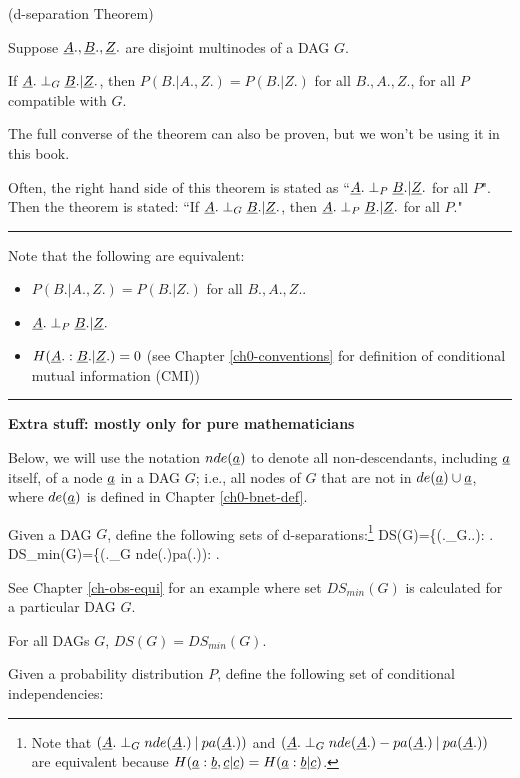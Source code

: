 \begin{claim}(d-separation Theorem)

Suppose
${\underline{A}}., {\underline{B}}., {\underline{Z}}.$
are disjoint multinodes
of a DAG  $G$.

If 
${\underline{A}}.\perp_G {\underline{B}}.|{\underline{Z}}.$, then
$P(B.|A., Z.)=P(B.|Z.)$
for all $B.,A., Z.$,
for all $P$
compatible with $G$.

\end{claim}
The full converse
of the theorem can also be 
proven, 
but we won't be using it
in this book.

Often, the right hand side
of this theorem is stated as 
``${\underline{A}}.\perp_P {\underline{B}}.|{\underline{Z}}.$
for all $P$".
Then the theorem is stated:
``If 
${\underline{A}}.\perp_G {\underline{B}}.|{\underline{Z}}.$, then
${\underline{A}}.\perp_P {\underline{B}}.|{\underline{Z}}.$ for all $P$."  

\hrule
Note that 
the following are equivalent:
\begin{itemize}
\item
$P(B.|A., Z.)=P(B.|Z.)$ for all $B., A., Z.$.
\item
${\underline{A}}.\perp_P {\underline{B}}.|{\underline{Z}}.$
\item
$H({\underline{A}}.:{\underline{B}}.|{\underline{Z}}.)=0$
(see Chapter \ref{ch0-conventions}
for definition of
 conditional mutual information (CMI))
\end{itemize}
\hrule\noindent
{\bf Extra stuff: mostly only for 
 pure mathematicians}

Below, we will use
the notation $nde({\underline{a}})$
to denote
all non-descendants,
including ${\underline{a}}$ itself, 
of a node ${\underline{a}}$
in a DAG $G$; i.e.,
all nodes of $G$ that are not
in $de({\underline{a}})\cup {\underline{a}}$, where
$de({\underline{a}})$
is defined in Chapter \ref{ch0-bnet-def}.

Given a DAG $G$, define 
the following
sets of d-separations:\footnote{
Note that
$({\underline{A}}.\perp_G
nde({\underline{A}}.){\:\mathbf{|}\:} pa({\underline{A}}.))$ and
$({\underline{A}}.\perp_G
nde({\underline{A}}.)-pa({\underline{A}}.){\:\mathbf{|}\:} pa({\underline{A}}.))$
are
equivalent
because
$H({\underline{a}}:{\underline{b}}, {\underline{c}}|{\underline{c}})=
H({\underline{a}}:{\underline{b}}|{\underline{c}})$.
}
\beq
DS(G)=\{(\rvA.\perp_G\rvB.\cond\rvZ.):
\;.
\eeq
\beq
DS_{min}(G)=\{(\rvA.\perp_G
nde(\rvA.)\cond pa(\rvA.)):
\;.
\eeq

See Chapter \ref{ch-obs-equi}
for an example
where set $DS_{min}(G)$
is calculated for 
a particular DAG $G$.

\begin{claim}
For all DAGs $G$, $DS(G)=DS_{min}(G)$.
\end{claim}

Given a probability distribution  $P$, 
define the following
set of conditional independencies:

